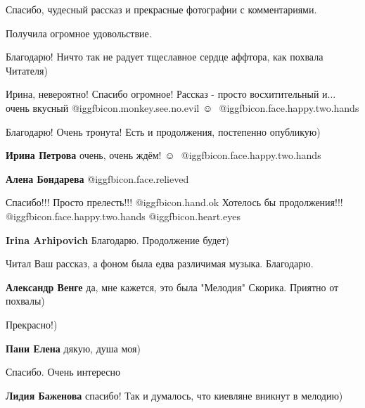 \begin{itemize}

Спасибо, чудесный рассказ и прекрасные фотографии с комментариями.

Получила огромное удовольствие.

\begin{itemize} %
Благодарю! Ничто так не радует тщеславное сердце аффтора, как похвала Читателя)
\end{itemize} %

Ирина, невероятно! Спасибо огромное! Рассказ - просто восхитительный и... очень вкусный  @igg{fbicon.monkey.see.no.evil}  ☺ ️  @igg{fbicon.face.happy.two.hands} 

\begin{itemize} %
Благодарю! Очень тронута! Есть и продолжения, постепенно опубликую)

\textbf{Ирина Петрова} очень, очень ждём!  ☺ ️  @igg{fbicon.face.happy.two.hands} 

\textbf{Алена Бондарева}  @igg{fbicon.face.relieved} 
\end{itemize} %

Спасибо!!! Просто прелесть!!!  @igg{fbicon.hand.ok} Хотелось бы продолжения!!!  @igg{fbicon.face.happy.two.hands}  @igg{fbicon.heart.eyes} 

\begin{itemize} %
\textbf{Irina Arhipovich} Благодарю. Продолжение будет)
\end{itemize} %

Читал Ваш рассказ, а фоном была едва различимая музыка. Благодарю.

\begin{itemize} %
\textbf{Александр Венге} да, мне кажется, это была "Мелодия" Скорика. Приятно от похвалы)
\end{itemize} %

Прекрасно!)

\begin{itemize} %
\textbf{Пани Елена} дякую, душа моя)
\end{itemize} %

Спасибо. Очень интересно

\begin{itemize} %
\textbf{Лидия Баженова} спасибо! Так и думалось, что киевляне вникнут в мелодию)
\end{itemize} %


\end{itemize}
